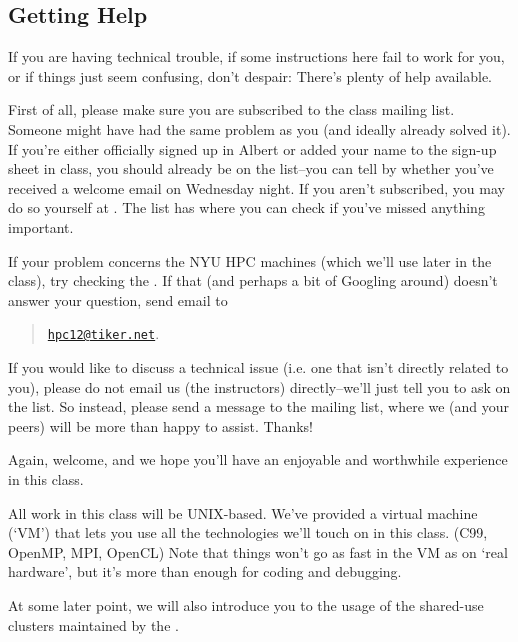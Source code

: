 \documentclass[11pt]{article}
\begin{document}
\clearpage

\subsection*{Getting Help}

If you are having technical trouble, if some instructions here fail to
work for you, or if things just seem confusing, don't despair: There's
plenty of help available.

First of all, please make sure you are subscribed to the class mailing
list. Someone might have had the same problem as you (and ideally
already solved it). If you're either officially signed up in Albert or
added your name to the sign-up sheet in class, you should already be
on the list--you can tell by whether you've received a welcome email
on Wednesday night.  If you aren't subscribed, you may do so yourself
at . The list has
 where you
can check if you've missed anything important.

If your problem concerns the NYU HPC machines (which we'll use later
in the class), try checking the
.  If that
(and perhaps a bit of Googling around) doesn't answer your question,
send email to
\begin{quote}
  \href{mailto:hpc12@tiker.net}{\texttt{hpc12@tiker.net}}.
\end{quote}

If you would like to discuss a technical issue (i.e. one that isn't
directly related to you), please do not email us (the instructors)
directly--we'll just tell you to ask on the list.  So instead, please
send a message to the mailing list, where we (and your peers) will be
more than happy to assist.  Thanks!

Again, welcome, and we hope you'll have an enjoyable and worthwhile
experience in this class.

\begin{note}
All work in this class will be UNIX-based.  We've provided a virtual
machine (`VM') that lets you use all the technologies we'll touch on
in this class. (C99, OpenMP, MPI, OpenCL) Note that things won't go as
fast in the VM as on `real hardware', but it's more than enough for
coding and debugging.

At some later point, we will also introduce you to the usage of the
shared-use clusters maintained by the .
\end{note}
\end{document}
